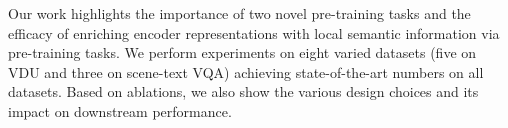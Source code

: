 \documentclass[10pt,twocolumn,letterpaper]{article}
\begin{document}
Our work \papertitle highlights the importance of two novel pre-training tasks and the efficacy of enriching encoder representations with local semantic information via pre-training tasks. We perform experiments on eight varied datasets (five on VDU and three on scene-text VQA) achieving state-of-the-art numbers on all datasets. Based on ablations, we also show the various 
design choices and its impact on downstream performance. 



























{\small


}
\end{document}
